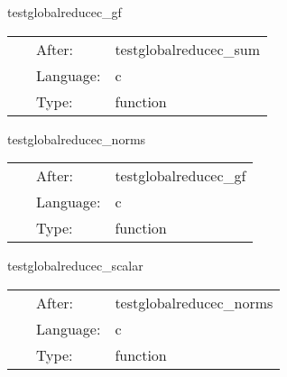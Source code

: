\vspace{5mm}


\hspace{5mm} testglobalreducec\_gf 

\hspace{5mm}{\it test out gf reduction } 


\hspace{5mm}

 \begin{tabular*}{160mm}{cll} 
~ & After:  & testglobalreducec\_sum \\ 
~ & Language:  & c \\ 
~ & Type:  & function \\ 
\end{tabular*} 


\vspace{5mm}


\hspace{5mm} testglobalreducec\_norms 

\hspace{5mm}{\it test out gf reduction } 


\hspace{5mm}

 \begin{tabular*}{160mm}{cll} 
~ & After:  & testglobalreducec\_gf \\ 
~ & Language:  & c \\ 
~ & Type:  & function \\ 
\end{tabular*} 


\vspace{5mm}


\hspace{5mm} testglobalreducec\_scalar 

\hspace{5mm}{\it test out gf reduction } 


\hspace{5mm}

 \begin{tabular*}{160mm}{cll} 
~ & After:  & testglobalreducec\_norms \\ 
~ & Language:  & c \\ 
~ & Type:  & function \\ 
\end{tabular*} 


